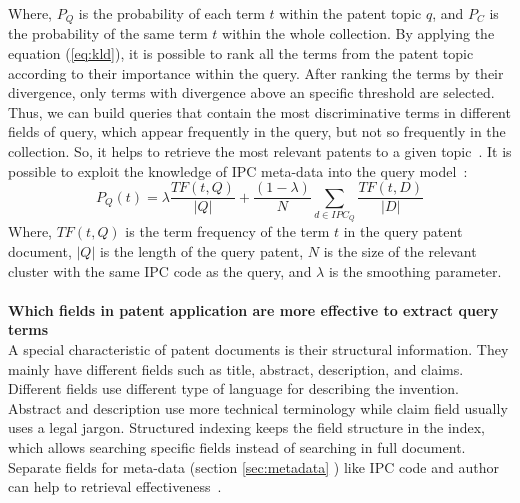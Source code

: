 Where, $ P_{Q} $ is the probability of each term $ t $ within the patent topic $ q $, and $ P_{C} $ is the probability of the same term $ t $ within the whole collection. 
By applying the equation (\ref{eq:kld}), it is possible to rank all the terms from the patent topic according to their importance within the query. After ranking the terms by their divergence, only terms with divergence above an specific threshold are selected. Thus, we can build queries that contain the most discriminative terms in different fields of query, which appear frequently in the query, but not so frequently in the collection. So, it helps to retrieve the most relevant patents to a given topic~\citep{perez2010using}. It is possible to exploit the knowledge of IPC meta-data into the query model~\citep{mahdabi2011building}:
\begin{equation}
\label{eq:IPCmodel}
 P_{Q}(t) = \lambda\frac{TF(t,Q)}{|Q|}+\frac{(1-\lambda)}{N}\sum_{d\in IPC_{Q}}\frac{TF(t,D)}{|D|}  
\end{equation}
Where, $ TF(t,Q) $ is the term frequency of the term $ t $ in the query patent document, $ |Q| $ is the length of the query patent, $ N $ is the size of the relevant cluster with the same IPC code as the query, and $ \lambda $ is the smoothing parameter.
\\\\ 
\textbf{Which fields in patent application are more effective to extract query terms}
\ \\
A special characteristic of patent documents is their structural information. They mainly have different fields such as title, abstract, description, and claims. Different fields use different type of language for describing the invention. Abstract and description use more technical terminology while claim field usually uses a legal jargon. Structured indexing keeps the field structure in the index, which allows searching specific fields instead of searching in full document. Separate fields for meta-data (section \ref{sec:metadata} ) like IPC code and author can help to retrieval effectiveness~\citep{magdy2010exploring}. 

